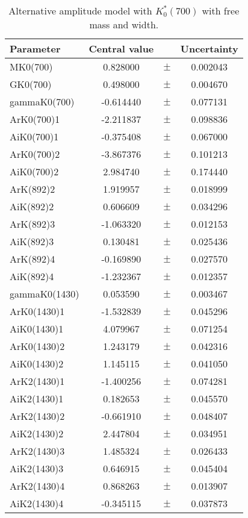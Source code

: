 \clearpage

\begin{table}
\centering
\caption{Alternative amplitude model with $K^*_0(700)$ with free mass and width.}
\begin{tiny}
\begin{tabular}{lccc}
\toprule
Parameter & Central value & & Uncertainty\\
\midrule 
MK0(700) & 0.828000 & $\pm$ & 0.002043 \\
GK0(700) & 0.498000 & $\pm$ & 0.004670 \\
gammaK0(700) & -0.614440 & $\pm$ & 0.077131 \\
ArK0(700)1 & -2.211837 & $\pm$ & 0.098836 \\
AiK0(700)1 & -0.375408 & $\pm$ & 0.067000 \\
ArK0(700)2 & -3.867376 & $\pm$ & 0.101213 \\
AiK0(700)2 & 2.984740 & $\pm$ & 0.174440 \\
ArK(892)2 & 1.919957 & $\pm$ & 0.018999 \\
AiK(892)2 & 0.606609 & $\pm$ & 0.034296 \\
ArK(892)3 & -1.063320 & $\pm$ & 0.012153 \\
AiK(892)3 & 0.130481 & $\pm$ & 0.025436 \\
ArK(892)4 & -0.169890 & $\pm$ & 0.027570 \\
AiK(892)4 & -1.232367 & $\pm$ & 0.012357 \\
gammaK0(1430) & 0.053590 & $\pm$ & 0.003467 \\
ArK0(1430)1 & -1.532839 & $\pm$ & 0.045296 \\
AiK0(1430)1 & 4.079967 & $\pm$ & 0.071254 \\
ArK0(1430)2 & 1.243179 & $\pm$ & 0.042316 \\
AiK0(1430)2 & 1.145115 & $\pm$ & 0.041050 \\
ArK2(1430)1 & -1.400256 & $\pm$ & 0.074281 \\
AiK2(1430)1 & 0.182653 & $\pm$ & 0.045570 \\
ArK2(1430)2 & -0.661910 & $\pm$ & 0.048407 \\
AiK2(1430)2 & 2.447804 & $\pm$ & 0.034951 \\
ArK2(1430)3 & 1.485324 & $\pm$ & 0.026433 \\
AiK2(1430)3 & 0.646915 & $\pm$ & 0.045404 \\
ArK2(1430)4 & 0.868263 & $\pm$ & 0.013907 \\
AiK2(1430)4 & -0.345115 & $\pm$ & 0.037873 \\

\end{tabular}
\end{tiny}
\end{table}
